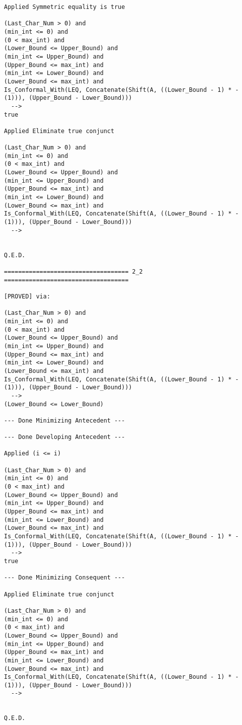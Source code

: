 \begin{lstlisting}[language=resolve]
Applied Symmetric equality is true

(Last_Char_Num > 0) and
(min_int <= 0) and
(0 < max_int) and
(Lower_Bound <= Upper_Bound) and
(min_int <= Upper_Bound) and
(Upper_Bound <= max_int) and
(min_int <= Lower_Bound) and
(Lower_Bound <= max_int) and
Is_Conformal_With(LEQ, Concatenate(Shift(A, ((Lower_Bound - 1) * -(1))), (Upper_Bound - Lower_Bound)))
  -->
true

Applied Eliminate true conjunct

(Last_Char_Num > 0) and
(min_int <= 0) and
(0 < max_int) and
(Lower_Bound <= Upper_Bound) and
(min_int <= Upper_Bound) and
(Upper_Bound <= max_int) and
(min_int <= Lower_Bound) and
(Lower_Bound <= max_int) and
Is_Conformal_With(LEQ, Concatenate(Shift(A, ((Lower_Bound - 1) * -(1))), (Upper_Bound - Lower_Bound)))
  -->


Q.E.D.

=================================== 2_2 ===================================

[PROVED] via:

(Last_Char_Num > 0) and
(min_int <= 0) and
(0 < max_int) and
(Lower_Bound <= Upper_Bound) and
(min_int <= Upper_Bound) and
(Upper_Bound <= max_int) and
(min_int <= Lower_Bound) and
(Lower_Bound <= max_int) and
Is_Conformal_With(LEQ, Concatenate(Shift(A, ((Lower_Bound - 1) * -(1))), (Upper_Bound - Lower_Bound)))
  -->
(Lower_Bound <= Lower_Bound)

--- Done Minimizing Antecedent ---

--- Done Developing Antecedent ---

Applied (i <= i)

(Last_Char_Num > 0) and
(min_int <= 0) and
(0 < max_int) and
(Lower_Bound <= Upper_Bound) and
(min_int <= Upper_Bound) and
(Upper_Bound <= max_int) and
(min_int <= Lower_Bound) and
(Lower_Bound <= max_int) and
Is_Conformal_With(LEQ, Concatenate(Shift(A, ((Lower_Bound - 1) * -(1))), (Upper_Bound - Lower_Bound)))
  -->
true

--- Done Minimizing Consequent ---

Applied Eliminate true conjunct

(Last_Char_Num > 0) and
(min_int <= 0) and
(0 < max_int) and
(Lower_Bound <= Upper_Bound) and
(min_int <= Upper_Bound) and
(Upper_Bound <= max_int) and
(min_int <= Lower_Bound) and
(Lower_Bound <= max_int) and
Is_Conformal_With(LEQ, Concatenate(Shift(A, ((Lower_Bound - 1) * -(1))), (Upper_Bound - Lower_Bound)))
  -->


Q.E.D.


\end{lstlisting}
